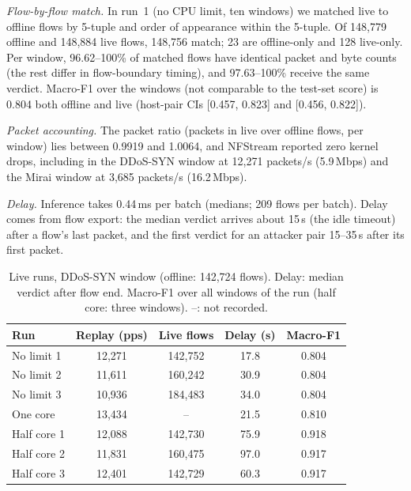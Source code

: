 \emph{Flow-by-flow match.} In run~1 (no CPU limit, ten windows) we matched live to offline flows by 5-tuple and order of appearance within the 5-tuple. Of 148,779 offline and 148,884 live flows, 148,756 match; 23 are offline-only and 128 live-only. Per window, 96.62--100\% of matched flows have identical packet and byte counts (the rest differ in flow-boundary timing), and 97.63--100\% receive the same verdict. Macro-F1 over the windows (not comparable to the test-set score) is 0.804 both offline and live (host-pair CIs [0.457, 0.823] and [0.456, 0.822]).

\emph{Packet accounting.} The packet ratio (packets in live over offline flows, per window) lies between 0.9919 and 1.0064, and NFStream reported zero kernel drops, including in the DDoS-SYN window at 12,271 packets/s (5.9\,Mbps) and the Mirai window at 3,685 packets/s (16.2\,Mbps).

\emph{Delay.} Inference takes 0.44\,ms per batch (medians; 209 flows per batch). Delay comes from flow export: the median verdict arrives about 15\,s (the idle timeout) after a flow's last packet, and the first verdict for an attacker pair 15--35\,s after its first packet.

\begin{table}[t]
\centering
\caption{Live runs, DDoS-SYN window (offline: 142,724 flows). Delay: median verdict after flow end. Macro-F1 over all windows of the run (half core: three windows). --: not recorded.}
\label{tab:repeats}
\footnotesize
\setlength{\tabcolsep}{3pt}
\begin{tabular}{lcccc}
\hline
Run & Replay (pps) & Live flows & Delay (s) & Macro-F1 \\
\hline
No limit 1 & 12,271 & 142,752 & 17.8 & 0.804 \\
No limit 2 & 11,611 & 160,242 & 30.9 & 0.804 \\
No limit 3 & 10,936 & 184,483 & 34.0 & 0.804 \\
One core   & 13,434 & -- & 21.5 & 0.810 \\
Half core 1 & 12,088 & 142,730 & 75.9 & 0.918 \\
Half core 2 & 11,831 & 160,475 & 97.0 & 0.917 \\
Half core 3 & 12,401 & 142,729 & 60.3 & 0.917 \\
\hline
\end{tabular}
\end{table}

